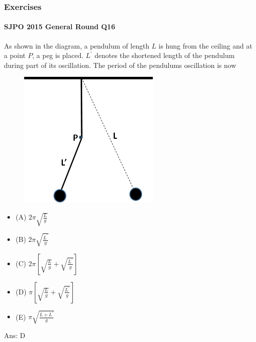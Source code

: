 \documentclass{article}
\begin{document}
\subsubsection{Exercises}
\begin{samepage}
\paragraph{SJPO 2015 General Round Q16}
As shown in the diagram, a pendulum of length $L$ is hung from the ceiling and at a point $P$, a peg is placed. $L^{\prime}$ denotes the shortened length of the pendulum during part of its oscillation. The period of the pendulums oscillation is now
\begin{figure}
\includegraphics[width=0.9\linewidth]{images/2015q16.png}
\end{figure}
\begin{itemize}
\item[](A) $2 \pi \sqrt{\frac{L}{g}}$
\item[](B) $2 \pi \sqrt{\frac{L^{\prime}}{g}}$
\item[](C) $2 \pi\left[\sqrt{\frac{L}{g}}+\sqrt{\frac{L^{\prime}}{g}}\right]$
\item[](D) $\pi\left[\sqrt{\frac{L}{g}}+\sqrt{\frac{L^{\prime}}{g}}\right]$
\item[](E) $\pi \sqrt{\frac{L+L^{\prime}}{g}}$
\end{itemize}
Ans: \ifpaper D \fi
\end{samepage}
\end{document}
